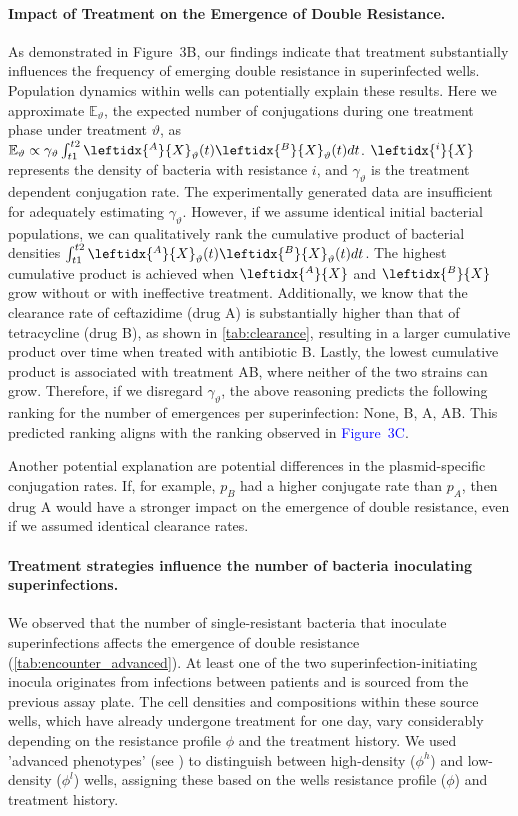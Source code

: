 \paragraph{Impact of Treatment on the Emergence of Double Resistance.}
As demonstrated in Figure~3B, our findings indicate that treatment substantially influences the frequency of emerging double resistance in superinfected wells.
Population dynamics within wells can potentially explain these results. 
Here we approximate  $\mathbb{E}_\vartheta$, the expected number of conjugations during one treatment phase under treatment $\vartheta$, as
$\mathbb{E}_\vartheta \propto \gamma_\vartheta \int_{t1}^{t2} \leftidx{^A}{X}_\vartheta(t) \leftidx{^B}{X}_\vartheta(t) dt$. 
$\leftidx{^i}{X}$ represents the density of bacteria with resistance $i$, and $\gamma_\vartheta$ is the treatment dependent conjugation rate.  
The experimentally generated data are insufficient for adequately estimating $\gamma_\vartheta$.  
However, if we assume identical initial bacterial populations, we can qualitatively rank the cumulative product of bacterial densities $\int_{t1}^{t2} \leftidx{^A}{X}_\vartheta(t) \leftidx{^B}{X}_\vartheta(t) dt$.  
The highest cumulative product is achieved when $\leftidx{^A}{X}$ and $\leftidx{^B}{X}$ grow without or with ineffective treatment.  
Additionally, we know that the clearance rate of ceftazidime (drug A) is substantially higher than that of tetracycline (drug B), as shown in \autoref{tab:clearance}, resulting in a larger cumulative product over time when treated with antibiotic B.  
Lastly, the lowest cumulative product is associated with treatment AB, where neither of the two strains can grow.  
Therefore, if we disregard $\gamma_\vartheta$, the above reasoning predicts the following ranking for the number of emergences per superinfection: None, B, A, AB.  
This predicted ranking aligns with the ranking observed in \textcolor{blue}{Figure~3C}.


Another potential explanation are potential differences in the plasmid-specific conjugation rates. 
If, for example, $p_B$ had a higher conjugate rate than  $p_A$, then drug A would have a stronger impact on the emergence of double resistance, even if we assumed identical clearance rates. 


\paragraph{Treatment strategies influence the number of bacteria inoculating superinfections. \label{ssec:inocula}}
We observed that the number of single-resistant bacteria that inoculate superinfections affects the emergence of double resistance (\autoref{tab:encounter_advanced}).
At least one of the two superinfection-initiating inocula originates from infections between patients and is sourced from the previous assay plate.
The cell densities and compositions within these source wells, which have already undergone treatment for one day, vary considerably depending on the resistance profile $\phi$ and the treatment history.
We used 'advanced phenotypes' (see ) to distinguish between high-density ($\phi^h$) and low-density ($\phi^l$) wells, assigning these based on the wells resistance profile ($\phi$) and treatment history.

